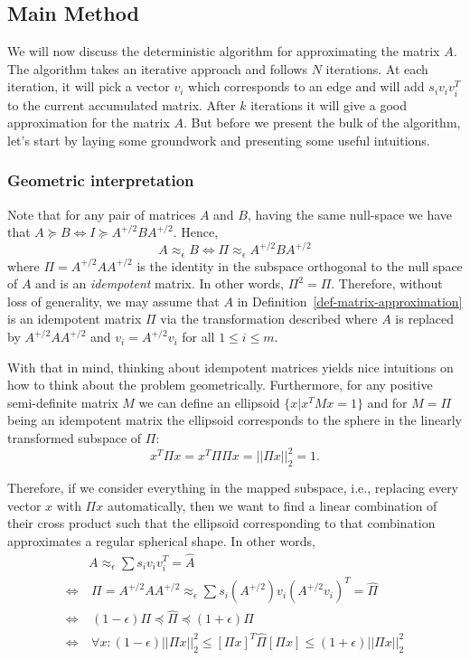 \documentclass[
  letterpaper,
  DIV=11,
  numbers=noendperiod]{scrartcl}
\theoremstyle{plain}
\theoremstyle{plain}
\theoremstyle{plain}
\theoremstyle{definition}
\theoremstyle{plain}
\theoremstyle{remark}
\begin{document}
\hypertarget{main-method}{%
\subsection{Main Method}\label{main-method}}

We will now discuss the deterministic algorithm for approximating the
matrix \(A\). The algorithm takes an iterative approach and follows
\(N\) iterations. At each iteration, it will pick a vector \(v_i\) which
corresponds to an edge and will add \(s_i v_i v_i^T\) to the current
accumulated matrix. After \(k\) iterations it will give a good
approximation for the matrix \(A\). But before we present the bulk of
the algorithm, let's start by laying some groundwork and presenting some
useful intuitions.

\hypertarget{geometric-interpretation}{%
\subsubsection{Geometric
interpretation}\label{geometric-interpretation}}

Note that for any pair of matrices \(A\) and \(B\), having the same
null-space we have that
\(A \succeq B \Longleftrightarrow I \succeq A^{+/2} B A^{+/2}\). Hence,
\[A \approx_\epsilon B \Longleftrightarrow \Pi \approx_\epsilon A^{+/2} B A^{+/2}\]
where \(\Pi = A^{+/2} A A^{+/2}\) is the identity in the subspace
orthogonal to the null space of \(A\) and is an \emph{idempotent}
matrix. In other words, \(\Pi^2 = \Pi\). Therefore, without loss of
generality, we may assume that \(A\) in
Definition~\ref{def-matrix-approximation} is an idempotent matrix
\(\Pi\) via the transformation described where \(A\) is replaced by
\(A^{+/2} A A^{+/2}\) and \(v_i = A^{+/2} v_i\) for all
\(1 \le i \le m\).

With that in mind, thinking about idempotent matrices yields nice
intuitions on how to think about the problem geometrically. Furthermore,
for any positive semi-definite matrix \(M\) we can define an ellipsoid
\(\{x | x^T M x = 1\}\) and for \(M = \Pi\) being an idempotent matrix
the ellipsoid corresponds to the sphere in the linearly transformed
subspace of \(\Pi\): \[x^T \Pi x = x^T \Pi \Pi x = ||\Pi x||_2^2 = 1.\]

Therefore, if we consider everything in the mapped subspace, i.e.,
replacing every vector \(x\) with \(\Pi x\) automatically, then we want
to find a linear combination of their cross product such that the
ellipsoid corresponding to that combination approximates a regular
spherical shape. In other words, \begin{align*}
&A \approx_\epsilon \sum s_i v_i v_i^T = \hat{A}  \\
\Longleftrightarrow & ~ \Pi =  A^{+/2} A A^{+/2} \approx_\epsilon \sum s_i (A^{+/2}) v_i (A^{+/2} v_i)^T = \hat{\Pi}\\
\Longleftrightarrow & ~ (1 - \epsilon) \Pi \preceq \hat{\Pi} \preceq (1 + \epsilon) \Pi \\
\Longleftrightarrow & ~ \forall x : (1 - \epsilon) ||\Pi x||_2^2 \le [\Pi x]^T \hat{\Pi} [\Pi x] \le (1 + \epsilon) ||\Pi x||_2^2 \\
\end{align*}
\end{document}
